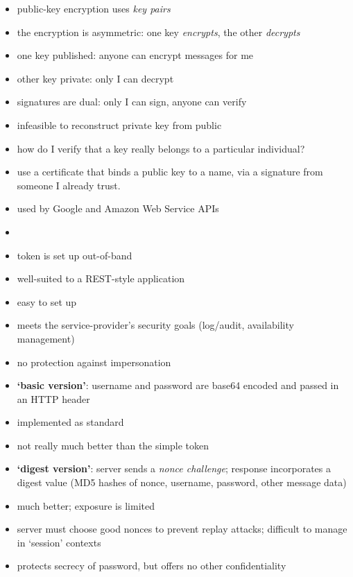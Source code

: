 \documentclass{sepslide-soa-faked} %
\def\colourbullet#1{\item[#1]}
\def\colourbullet#1{\item[\large\textbf{\textcolor{BulletColor}{#1}}]}
\def\pro{\colourbullet{(+)}}
\def\con{\colourbullet{(--)}}
\begin{document}
\begin{slide}
	\begin{itemize}
	\item public-key encryption uses \emph{key pairs}
	\item the encryption is asymmetric: one key \emph{encrypts},
		the other \emph{decrypts}
	\item one key published: anyone can encrypt messages for me
	\item other key private: only I can decrypt
	\item signatures are dual: only I can sign, anyone can verify
	\item infeasible to reconstruct private key from public
	\colourbullet{Q:} how do I verify that a key really belongs to a particular individual?
	\colourbullet{A:} use a certificate that binds a public key to a name, via a signature from someone I already trust.
	\end{itemize}
\end{slide}

\begin{slide}
	\begin{itemize}
	\item used by Google and Amazon Web Service APIs
	\item {}
	\item token is set up out-of-band
	\item well-suited to a REST-style application
	\pro easy to set up
	\pro meets the service-provider's security goals 
			(log/audit, availability management)
	\con no protection against impersonation
	\end{itemize}
\end{slide}

\begin{slide}
	\begin{itemize}
	\item \textbf{`basic version'}: username and password are base64
	encoded and passed in an HTTP header
	\pro implemented as standard
	\con not really much better than the simple token
\medskip
	\item \textbf{`digest version'}: server sends a \emph{nonce challenge};
		response incorporates a digest value (MD5 hashes of
		nonce, username, password, other message data)
        \pro much better; exposure is limited
	\con server must choose good nonces to prevent replay attacks;
		difficult to manage in `session' contexts
	\con protects secrecy of password, but offers no other confidentiality
	\end{itemize}
\end{slide}
\end{document}
